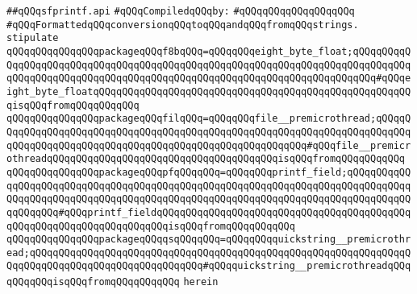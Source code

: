 \label{src/lib/src/sfprintf.api}
\verb|##qQQqsfprintf.api|\newline
\newline
\verb|#qQQqCompiledqQQqby:|\newline
\verb|#qQQqqQQqqQQqqQQqqQQq|\newline
\newline
\newline
\newline
\verb|#qQQqFormattedqQQqconversionqQQqtoqQQqandqQQqfromqQQqstrings.|\newline
\newline
\verb|stipulate|\newline
\verb|qQQqqQQqqQQqqQQqpackageqQQqf8bqQQq=qQQqqQQqeight_byte_float;qQQqqQQqqQQqqQQqqQQqqQQqqQQqqQQqqQQqqQQqqQQqqQQqqQQqqQQqqQQqqQQqqQQqqQQqqQQqqQQqqQQqqQQqqQQqqQQqqQQqqQQqqQQqqQQqqQQqqQQqqQQqqQQqqQQqqQQqqQQqqQQq#qQQqeight_byte_floatqQQqqQQqqQQqqQQqqQQqqQQqqQQqqQQqqQQqqQQqqQQqqQQqqQQqqQQqisqQQqfromqQQqqQQqqQQq|\newline
\verb|qQQqqQQqqQQqqQQqpackageqQQqfilqQQq=qQQqqQQqfile__premicrothread;qQQqqQQqqQQqqQQqqQQqqQQqqQQqqQQqqQQqqQQqqQQqqQQqqQQqqQQqqQQqqQQqqQQqqQQqqQQqqQQqqQQqqQQqqQQqqQQqqQQqqQQqqQQqqQQqqQQqqQQqqQQqqQQq#qQQqfile__premicrothreadqQQqqQQqqQQqqQQqqQQqqQQqqQQqqQQqqQQqqQQqisqQQqfromqQQqqQQqqQQq|\newline
\verb|qQQqqQQqqQQqqQQqpackageqQQqpfqQQqqQQq=qQQqqQQqprintf_field;qQQqqQQqqQQqqQQqqQQqqQQqqQQqqQQqqQQqqQQqqQQqqQQqqQQqqQQqqQQqqQQqqQQqqQQqqQQqqQQqqQQqqQQqqQQqqQQqqQQqqQQqqQQqqQQqqQQqqQQqqQQqqQQqqQQqqQQqqQQqqQQqqQQqqQQqqQQqqQQq#qQQqprintf_fieldqQQqqQQqqQQqqQQqqQQqqQQqqQQqqQQqqQQqqQQqqQQqqQQqqQQqqQQqqQQqqQQqqQQqqQQqisqQQqfromqQQqqQQqqQQq|\newline
\verb|qQQqqQQqqQQqqQQqpackageqQQqqsqQQqqQQq=qQQqqQQqquickstring__premicrothread;qQQqqQQqqQQqqQQqqQQqqQQqqQQqqQQqqQQqqQQqqQQqqQQqqQQqqQQqqQQqqQQqqQQqqQQqqQQqqQQqqQQqqQQqqQQqqQQqqQQq#qQQqquickstring__premicrothreadqQQqqQQqqQQqisqQQqfromqQQqqQQqqQQq|\newline
\verb|herein|\newline
\newline
